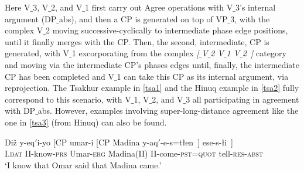 \documentclass[output=paper
,modfonts
,nonflat]{langsci/langscibook}
\begin{document}
Here V$\_$3, V$\_$2, and V$\_$1 first carry out Agree operations with V$\_$3's
internal argument (DP$\_${abs}), and then a CP is generated on top of
VP$\_$3, with the complex V$\_$2 moving successive-cyclically to
intermediate phase edge positions, until it finally merges with the
CP. Then, the second, intermediate, CP is generated, with V$\_$1
excorporating from the complex {\itshape [$\_${V$\_$2} V$\_$1 V$\_$2~]} category and
moving via the intermediate CP's phases edges until, finally, the
intermediate CP has been completed and V$\_$1 can take this CP as its
internal argument, via reprojection. The Tsakhur example in \ref{tsa1}
and the Hinuq example in \ref{tsa2} 
fully correspond to this scenario, with V$\_$1, V$\_$2, and V$\_$3 all
participating in agreement with DP$\_${abs}. However, examples
involving super-long-distance agreement like the one in 
\ref{tsa3} (from Hinuq) can also be found. 

\ea\label{ex:mueller:36} 
\gll Di\v{z} \label{tsa3}y-eq$'$i-yo [CP \textglotstop umar-i [CP Madina  y-aq$'$-e-s=t\l en~] ese-s-\l i~]\\
I.{\scshape dat} II-know-{\scshape prs} {} Umar-{\scshape erg} {} Madina(II) II-come-{\scshape pst}={\scshape quot} tell-{\scshape res}-{\scshape abst}\\
\glt `I know that Omar said that Madina came.'
\z
\end{document}
